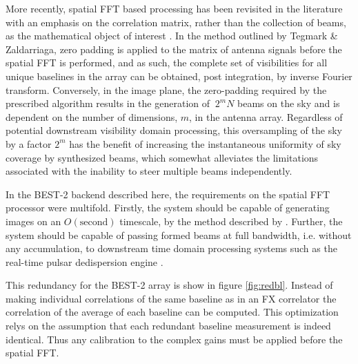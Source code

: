 \documentclass[useAMS,macros,usenatbib,onecolumn]{mn2e}
\begin{document}
More recently, spatial FFT based processing has been revisited in the literature with an emphasis on the correlation matrix, rather than the collection of beams, as the mathematical object of interest \citep{fftt} \citep{omniscope}.
In the method outlined by Tegmark \& Zaldarriaga, zero padding is applied to the matrix of antenna signals before the spatial FFT is performed, and as such, the complete set of visibilities for all unique baselines in the array can be obtained, post integration, by inverse Fourier transform.
Conversely, in the image plane, the zero-padding required by the prescribed algorithm results in the generation of $~2^{m}N$ beams on the sky and is dependent on the number of dimensions, $m$, in the antenna array.
Regardless of potential downstream visibility domain processing, this oversampling of the sky by a factor $2^{m}$ has the benefit of increasing the instantaneous uniformity of sky coverage by synthesized beams, which somewhat alleviates the limitations associated with the inability to steer multiple beams independently.

In the BEST-2 backend described here, the requirements on the spatial FFT processor were multifold.
Firstly, the system should be capable of generating images on an $O(\mathrm{second})$ timescale, by the method described by \citep{fftt}.
Further, the system should be capable of passing formed beams at full bandwidth, i.e. without any accumulation, to downstream time domain processing systems such as the real-time pulsar dedispersion engine \citep{dedispersion}. 

This redundancy for the BEST-2 array is show in figure \ref{fig:redbl}.
Instead of making individual correlations of the same baseline as in an FX correlator the correlation of the average of each baseline can be computed.
This optimization relys on the assumption that each redundant baseline measurement is indeed identical.
Thus any calibration to the complex gains must be applied before the spatial FFT.
\end{document}
